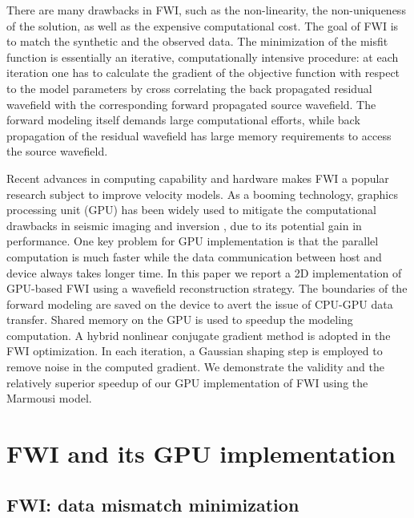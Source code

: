There are many drawbacks in FWI, such as the non-linearity, the non-uniqueness of the solution, as well as the expensive computational cost. The goal of FWI is to match the synthetic and the observed data.
The minimization of the misfit function is essentially an iterative, computationally intensive procedure: at each iteration one has to calculate the gradient of the objective function with respect to the model parameters by cross correlating the back propagated residual wavefield with the corresponding forward propagated source wavefield. The forward modeling itself demands large computational efforts, while back propagation of the residual wavefield has large memory requirements to access the source wavefield. 

Recent advances in computing capability and hardware makes FWI a popular research subject to improve velocity models. As a booming technology, graphics processing unit (GPU) has been widely used to mitigate the computational drawbacks in seismic imaging \citep{micikevicius20093d,Yang201464} and inversion \citep{boonyasiriwat2010multisource,shin20143d}, due to its potential gain in performance. 
One key problem for GPU implementation is that the parallel computation is much faster while the data communication between host and device always takes longer time.  In this paper we report a 2D implementation of  GPU-based FWI using a wavefield reconstruction strategy. The boundaries of the forward modeling are saved on the device to avert the issue of CPU-GPU data transfer. Shared memory on the GPU is used to speedup the modeling computation. A hybrid nonlinear conjugate gradient method is adopted in the FWI optimization.  In each iteration, a Gaussian shaping step is employed to remove noise in the computed gradient. We demonstrate the validity and the relatively superior speedup of our GPU implementation of FWI using the Marmousi model.


\section{FWI and its GPU implementation}

\subsection{FWI: data mismatch minimization}

